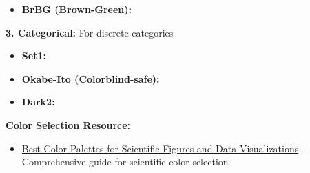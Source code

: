 \documentclass[11pt,a4paper]{article}
\begin{document}
\begin{tcolorbox}[colback=blue!5,colframe=blue!50,title={Professional Color Palettes}]
\begin{itemize}
    \item \textbf{BrBG (Brown-Green):} 
    \colorbox[HTML]{543005}{\phantom{XX}}
    \colorbox[HTML]{8c510a}{\phantom{XX}}
    \colorbox[HTML]{bf812d}{\phantom{XX}}
    \colorbox[HTML]{dfc27d}{\phantom{XX}}
    \colorbox[HTML]{f6e8c3}{\phantom{XX}}
    \colorbox[HTML]{c7eae5}{\phantom{XX}}
    \colorbox[HTML]{80cdc1}{\phantom{XX}}
    \colorbox[HTML]{35978f}{\phantom{XX}}
    \colorbox[HTML]{01665e}{\phantom{XX}}
    \colorbox[HTML]{003c30}{\phantom{XX}}
\end{itemize}

\textbf{3. Categorical:} For discrete categories

\begin{itemize}
    \item \textbf{Set1:} 
    \colorbox[HTML]{e41a1c}{\phantom{XX}}
    \colorbox[HTML]{377eb8}{\phantom{XX}}
    \colorbox[HTML]{4daf4a}{\phantom{XX}}
    \colorbox[HTML]{984ea3}{\phantom{XX}}
    \colorbox[HTML]{ff7f00}{\phantom{XX}}
    \colorbox[HTML]{ffff33}{\phantom{XX}}
    \colorbox[HTML]{a65628}{\phantom{XX}}
    \colorbox[HTML]{f781bf}{\phantom{XX}}
    \colorbox[HTML]{999999}{\phantom{XX}}
    
    \item \textbf{Okabe-Ito (Colorblind-safe):} 
    \colorbox[HTML]{E69F00}{\phantom{XX}}
    \colorbox[HTML]{56B4E9}{\phantom{XX}}
    \colorbox[HTML]{009E73}{\phantom{XX}}
    \colorbox[HTML]{F0E442}{\phantom{XX}}
    \colorbox[HTML]{0072B2}{\phantom{XX}}
    \colorbox[HTML]{D55E00}{\phantom{XX}}
    \colorbox[HTML]{CC79A7}{\phantom{XX}}
    \colorbox[HTML]{000000}{\phantom{XX}}
    
    \item \textbf{Dark2:} 
    \colorbox[HTML]{1b9e77}{\phantom{XX}}
    \colorbox[HTML]{d95f02}{\phantom{XX}}
    \colorbox[HTML]{7570b3}{\phantom{XX}}
    \colorbox[HTML]{e7298a}{\phantom{XX}}
    \colorbox[HTML]{66a61e}{\phantom{XX}}
    \colorbox[HTML]{e6ab02}{\phantom{XX}}
    \colorbox[HTML]{a6761d}{\phantom{XX}}
    \colorbox[HTML]{666666}{\phantom{XX}}
\end{itemize}
\end{tcolorbox}

\textbf{Color Selection Resource:}
\begin{itemize}
    \item \href{https://www.simplifiedsciencepublishing.com/resources/best-color-palettes-for-scientific-figures-and-data-visualizations}{Best Color Palettes for Scientific Figures and Data Visualizations} - Comprehensive guide for scientific color selection
\end{itemize}
\end{document}
